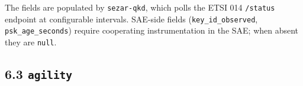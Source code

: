 The fields are populated by \texttt{sezar-qkd}, which polls the ETSI 014
\texttt{/status} endpoint at configurable intervals. SAE-side fields
(\texttt{key\_id\_observed}, \texttt{psk\_age\_seconds}) require
cooperating instrumentation in the SAE; when absent they are
\texttt{null}.

\subsection{\texorpdfstring{6.3
\texttt{agility}}{6.3 agility}}\label{agility}

\begin{Shaded}
\begin{Highlighting}[]
\FunctionTok{\{}
  \FunctionTok{:} \FunctionTok{,}
  \FunctionTok{:} \FunctionTok{,}
  \FunctionTok{:} \OtherTok{[}
    \FunctionTok{\{}
      \FunctionTok{:} \FunctionTok{,}
      \FunctionTok{:} \FunctionTok{,}
      \FunctionTok{:} \FunctionTok{,}
      \FunctionTok{:} 
    \FunctionTok{\}}\OtherTok{,}
    \FunctionTok{\{}
      \FunctionTok{:} \FunctionTok{,}
      \FunctionTok{:} 
    \FunctionTok{\}}
  \OtherTok{]}\FunctionTok{,}
  \FunctionTok{:} \FunctionTok{,}
  \FunctionTok{:} 
\FunctionTok{\}}
\end{Highlighting}
\end{Shaded}

